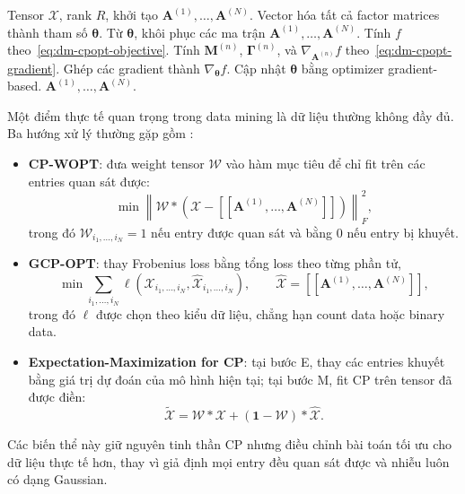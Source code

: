 \begin{algorithm}[H]
\caption{CP-OPT dạng all-at-once}
\label{alg:dm-cp-opt}
\begin{algorithmic}[1]
    \Require Tensor $\mathcal{X}$, rank $R$, khởi tạo $\mathbf{A}^{(1)},\ldots,\mathbf{A}^{(N)}$.
    \State Vector hóa tất cả factor matrices thành tham số $\boldsymbol{\theta}$.
    \Repeat
        \State Từ $\boldsymbol{\theta}$, khôi phục các ma trận $\mathbf{A}^{(1)},\ldots,\mathbf{A}^{(N)}$.
        \State Tính $f$ theo~\eqref{eq:dm-cpopt-objective}.
            \State Tính $\mathbf{M}^{(n)}$, $\boldsymbol{\Gamma}^{(n)}$, và $\nabla_{\mathbf{A}^{(n)}}f$ theo~\eqref{eq:dm-cpopt-gradient}.
        \EndFor
        \State Ghép các gradient thành $\nabla_{\boldsymbol{\theta}}f$.
        \State Cập nhật $\boldsymbol{\theta}$ bằng optimizer gradient-based.
    \State \Return $\mathbf{A}^{(1)},\ldots,\mathbf{A}^{(N)}$.
\end{algorithmic}
\end{algorithm}

Một điểm thực tế quan trọng trong data mining là dữ liệu thường không đầy đủ. Ba hướng xử lý thường gặp gồm \cite{chrysos2025foundationsTutorial}:
\begin{itemize}[leftmargin=2em]
    \item \textbf{CP-WOPT}: đưa weight tensor $\mathcal{W}$ vào hàm mục tiêu để chỉ fit trên các entries quan sát được:
    \begin{equation}
        \min
        \left\|
        \mathcal{W} \ast
        \left(
        \mathcal{X}
        -
        [\![\mathbf{A}^{(1)}, \ldots, \mathbf{A}^{(N)}]\!]
        \right)
        \right\|_F^2,
        \label{eq:dm-cpwopt}
    \end{equation}
    trong đó $\mathcal{W}_{i_1,\ldots,i_N}=1$ nếu entry được quan sát và bằng $0$ nếu entry bị khuyết.
    \item \textbf{GCP-OPT}: thay Frobenius loss bằng tổng loss theo từng phần tử,
    \begin{equation}
        \min
        \sum_{i_1,\ldots,i_N}
        \ell\!\left(
        \mathcal{X}_{i_1,\ldots,i_N},
        \hat{\mathcal{X}}_{i_1,\ldots,i_N}
        \right),
        \qquad
        \hat{\mathcal{X}}=[\![\mathbf{A}^{(1)},\ldots,\mathbf{A}^{(N)}]\!],
        \label{eq:dm-gcp}
    \end{equation}
    trong đó $\ell$ được chọn theo kiểu dữ liệu, chẳng hạn count data hoặc binary data.
    \item \textbf{Expectation-Maximization for CP}: tại bước E, thay các entries khuyết bằng giá trị dự đoán của mô hình hiện tại; tại bước M, fit CP trên tensor đã được điền:
    \begin{equation}
        \widetilde{\mathcal{X}}
        =
        \mathcal{W}\ast\mathcal{X}
        +
        (\mathbf{1}-\mathcal{W})\ast\hat{\mathcal{X}}.
        \label{eq:dm-em-impute}
    \end{equation}
\end{itemize}
Các biến thể này giữ nguyên tinh thần CP nhưng điều chỉnh bài toán tối ưu cho dữ liệu thực tế hơn, thay vì giả định mọi entry đều quan sát được và nhiễu luôn có dạng Gaussian.

